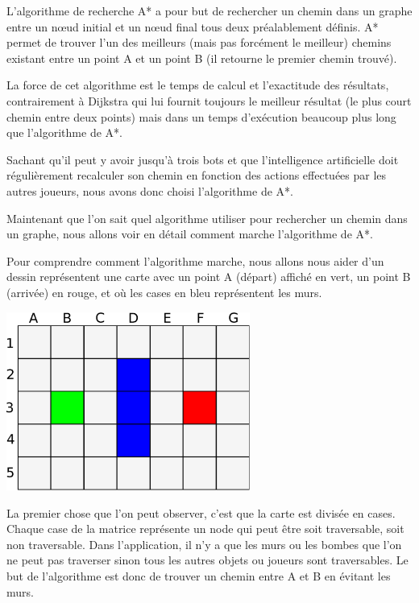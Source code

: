 			L'algorithme de recherche A* a pour but de rechercher un chemin
			dans un graphe entre un nœud initial et un nœud final tous deux préalablement
			définis. A* permet de trouver l'un des meilleurs (mais pas forcément le
			meilleur) chemins existant entre un point A et un point B (il retourne le premier chemin trouvé).
			
			La force de cet algorithme est le temps de calcul et l'exactitude des résultats, contrairement à Dijkstra qui lui fournit toujours le meilleur résultat (le plus court chemin entre deux points) mais dans un temps d'exécution beaucoup plus long que l'algorithme de A*.
			
			Sachant qu'il peut y avoir jusqu'à trois \glspl{bot} et que l'intelligence artificielle doit régulièrement recalculer son chemin en fonction des actions effectuées par les autres joueurs, nous avons donc choisi l'algorithme de A*.
		
			Maintenant que l'on sait quel algorithme utiliser pour rechercher un chemin dans un graphe, nous allons voir en détail comment marche l'algorithme de A*.
		
			Pour comprendre comment l'algorithme marche, nous allons nous aider d'un
			dessin représentent une carte avec un point A (départ) affiché en vert, un
			point B (arrivée) en rouge, et où les cases en bleu représentent les murs.
		
			\begin{center}
				\includegraphics[width=8cm]{./Analyse/Img/Grille.eps}
			\end{center}
		
			La premier chose que l'on peut observer, c'est que la carte est divisée en
			cases. Chaque case de la matrice représente un node qui peut être soit
			traversable, soit non traversable. Dans l'application, il n'y a que les murs
			ou les bombes que l'on ne peut pas traverser sinon tous les autres objets
			ou joueurs sont traversables. Le but de l'algorithme est donc de
			trouver un chemin entre A et B en évitant les murs.
			
